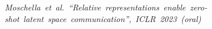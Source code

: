 \documentclass[preview]{standalone}
\begin{document}
\begin{center}
\mbox{\textit{Moschella et al. “Relative representations enable zero-shot latent space communication”, ICLR 2023 (oral)}}
\end{center}
\end{document}
